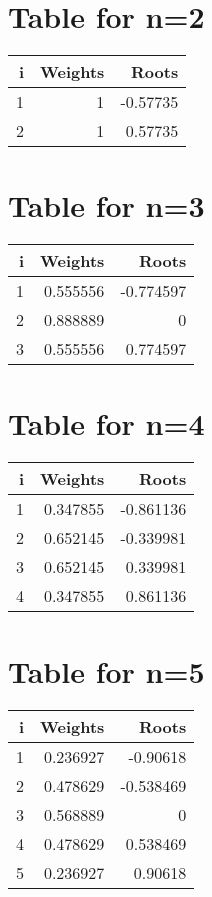 \documentclass{article}
\begin{document}
\section*{Table for n=2}
\begin{tabular}{rrr}
\hline
   i &   Weights &    Roots \\
\hline
   1 &         1 & -0.57735 \\
   2 &         1 &  0.57735 \\
\hline
\end{tabular}

\section*{Table for n=3}
\begin{tabular}{rrr}
\hline
   i &   Weights &     Roots \\
\hline
   1 &  0.555556 & -0.774597 \\
   2 &  0.888889 &  0        \\
   3 &  0.555556 &  0.774597 \\
\hline
\end{tabular}

\section*{Table for n=4}
\begin{tabular}{rrr}
\hline
   i &   Weights &     Roots \\
\hline
   1 &  0.347855 & -0.861136 \\
   2 &  0.652145 & -0.339981 \\
   3 &  0.652145 &  0.339981 \\
   4 &  0.347855 &  0.861136 \\
\hline
\end{tabular}

\section*{Table for n=5}
\begin{tabular}{rrr}
\hline
   i &   Weights &     Roots \\
\hline
   1 &  0.236927 & -0.90618  \\
   2 &  0.478629 & -0.538469 \\
   3 &  0.568889 &  0        \\
   4 &  0.478629 &  0.538469 \\
   5 &  0.236927 &  0.90618  \\
\hline
\end{tabular}
\end{document}
